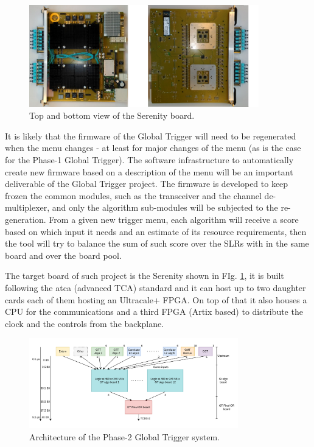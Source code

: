 \documentclass[../../main.tex]{subfiles}
\begin{document}
\begin{figure}[h]
    \centering
    \includegraphics[width=0.89\textwidth]{sections/02/Images/Serenity1v5_combined.png}
    \caption{Top and bottom view of the Serenity board.}
    \label{fig:Phase-2_Serenity}
\end{figure}

It is likely that the firmware of the Global Trigger will need to be regenerated when the menu changes - at least for major changes of the menu (as is the case for the Phase-1 Global Trigger). The software infrastructure to automatically create new firmware based on a description of the menu will be an important deliverable of the Global Trigger project. The firmware is developed to keep frozen the common modules, such as the transceiver and the channel de-multiplexer, and only the algorithm sub-modules will be subjected to the re-generation. From a given new trigger menu, each algorithm will receive a score based on which input it needs and an estimate of its resource requirements, then the tool will try to balance the sum of such score over the SLRs with in the same board and over the board pool.  

The target board of such project is the Serenity\cite{Serenity} shown in FIg. \ref{fig:Phase-2_Serenity}, it is built following the \acrshort{atca} (advanced TCA) standard and it can host up to two daughter cards each of them hosting an Ultracale+ FPGA. On top of that it  also houses a CPU for the communications and a third FPGA (Artix based) to distribute the clock and the controls from the backplane. 

\begin{figure}[h]
    \centering
    \includegraphics[width=0.81\textwidth]{sections/02/Images/GT_TDR.pdf}
    \caption{Architecture of the Phase-2 Global Trigger system.}
    \label{fig:GT-TDR}
\end{figure}
\end{document}
